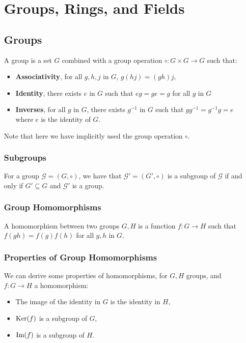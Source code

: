 \section{Groups, Rings, and Fields}

\subsection{Groups}

A group is a set $G$ combined with a group operation 
$\circ : G \times G \to G$ such that: \begin{itemize}
  \item \textbf{Associativity}, for all $g, h, j$ in $G$, $g(hj) = (gh)j$,
  \item \textbf{Identity}, there exists $e$ in $G$ such that $eg = ge = g$ 
  for all $g$ in $G$
  \item \textbf{Inverses}, for all $g$ in $G$, there exists $g^{-1}$ in $G$ 
  such that $gg^{-1} = g^{-1}g = e$ where $e$ is the identity of $G$.
\end{itemize} Note that here we have implicitly used the group operation $\circ$.

\subsubsection{Subgroups}

For a group $\mathcal{G} = (G, \circ)$, we have that 
$\mathcal{G}' = (G', \circ)$ is a subgroup of $\mathcal{G}$
if and only if $G' \subseteq G$
and $\mathcal{G}'$ is a group.

\subsubsection{Group Homomorphisms}

A homomorphism between two groups $G, H$ is a function $f : G \to H$
such that $f(gh) = f(g)f(h)$ for all $g, h$ in $G$.

\subsubsection{Properties of Group Homomorphisms}

We can derive some properties of homomorphisms, for
$G, H$ groups, and $f : G \to H$ a homomorphism: \begin{itemize}
  \item The image of the identity in $G$ is the identity in $H$,
  \item $\operatorname{Ker}(f)$ is a subgroup of $G$,
  \item $\operatorname{Im}(f)$ is a subgroup of $H$.
\end{itemize}

